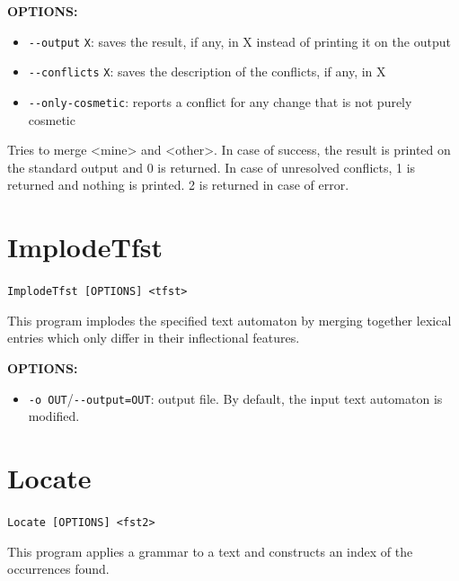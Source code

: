\bigskip
\noindent \textbf{OPTIONS:}
\begin{itemize}
\item \verb+--output+ \verb+X+: saves the result, if any, in X instead of printing it on the output
\item \verb+--conflicts+ \verb+X+: saves the description of the conflicts, if any, in X
\item \verb+--only-cosmetic+: reports a conflict for any change that is not purely cosmetic
\end{itemize}

Tries to merge <mine> and <other>. In case of success, the result is printed on the
standard output and 0 is returned. In case of unresolved conflicts, 1 is returned and
nothing is printed. 2 is returned in case of error.



\section{ImplodeTfst}
 \verb+ImplodeTfst [OPTIONS] <tfst>+

\bigskip
\noindent This program implodes the specified text automaton by merging
together lexical entries which only differ in their inflectional features.

\bigskip
\noindent \textbf{OPTIONS:}
\begin{itemize}
  \item \verb+-o OUT+/\verb+--output=OUT+: output file. By default, the input
  text automaton is modified.
\end{itemize}






\section{Locate}
\verb+Locate [OPTIONS] <fst2>+

\bigskip
\noindent {}
This program applies a grammar to a text and constructs an index of the
occurrences found.

